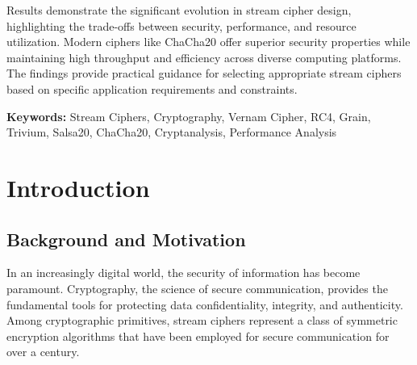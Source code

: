 \documentclass[12pt,a4paper,oneside]{report}
\begin{document}
Results demonstrate the significant evolution in stream cipher design, highlighting the trade-offs between security, performance, and resource utilization. Modern ciphers like ChaCha20 offer superior security properties while maintaining high throughput and efficiency across diverse computing platforms. The findings provide practical guidance for selecting appropriate stream ciphers based on specific application requirements and constraints.

\textbf{Keywords:} Stream Ciphers, Cryptography, Vernam Cipher, RC4, Grain, Trivium, Salsa20, ChaCha20, Cryptanalysis, Performance Analysis

\cleardoublepage

\tableofcontents
\cleardoublepage

\listoffigures
{}
\cleardoublepage

\listoftables
{}
\cleardoublepage

\listofalgorithms
{}
\cleardoublepage


\chapter{Introduction}
\label{ch:introduction}

\section{Background and Motivation}
\label{sec:background}

In an increasingly digital world, the security of information has become paramount. Cryptography, the science of secure communication, provides the fundamental tools for protecting data confidentiality, integrity, and authenticity. Among cryptographic primitives, stream ciphers represent a class of symmetric encryption algorithms that have been employed for secure communication for over a century.
\end{document}
